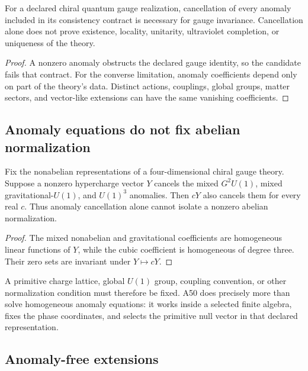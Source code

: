 \documentclass[11pt]{article}
\begin{document}
\begin{proposition}
\label{prop:anomaly-necessary}
For a declared chiral quantum gauge realization, cancellation of every anomaly
included in its consistency contract is necessary for gauge invariance.
Cancellation alone does not prove existence, locality, unitarity, ultraviolet
completion, or uniqueness of the theory.
\end{proposition}

\begin{proof}
A nonzero anomaly obstructs the declared gauge identity, so the candidate
fails that contract.  For the converse limitation, anomaly coefficients depend
only on part of the theory's data.  Distinct actions, couplings, global groups,
matter sectors, and vector-like extensions can have the same vanishing
coefficients.
\end{proof}

\subsection{Anomaly equations do not fix abelian normalization}

\begin{theorem}
\label{thm:scaling}
Fix the nonabelian representations of a four-dimensional chiral gauge theory.
Suppose a nonzero hypercharge vector $Y$ cancels the mixed
$G^2U(1)$, mixed gravitational-$U(1)$, and $U(1)^3$ anomalies.  Then
$cY$ also cancels them for every real $c$.  Thus anomaly cancellation alone
cannot isolate a nonzero abelian normalization.
\end{theorem}

\begin{proof}
The mixed nonabelian and gravitational coefficients are homogeneous linear
functions of $Y$, while the cubic coefficient is homogeneous of degree three.
Their zero sets are invariant under $Y\mapsto cY$.
\end{proof}

A primitive charge lattice, global $U(1)$ group, coupling convention, or other
normalization condition must therefore be fixed.  A50 does precisely more than
solve homogeneous anomaly equations: it works inside a selected finite algebra,
fixes the phase coordinates, and selects the primitive null vector in that
declared representation.

\subsection{Anomaly-free extensions}
\end{document}

